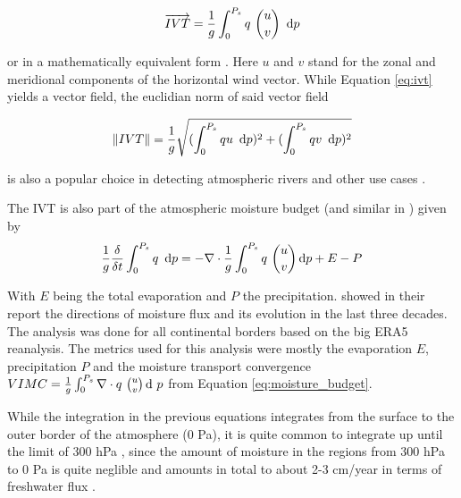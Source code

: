 \begin{equation}
\label{eq:ivt}  
\overrightarrow{IVT} = \frac{1}{g} \int^{P_s}_0 q ~\binom{u}{v} ~ \operatorname{d}\!{p}
\end{equation}

or in a mathematically equivalent form \cite{fernandez_analysis_2003}.
Here $u$ and $v$ stand for the zonal and meridional components of the horizontal wind vector. 
While Equation \ref{eq:ivt} yields a vector field, the euclidian norm of said vector field 

\begin{equation}
\label{eq:ivtnorm}
\lVert IVT \rVert = \frac{1}{g} \sqrt{(\int^{P_s}_0 qu ~ \operatorname{d}\!{p})^2 + (\int^{P_s}_0 qv ~ \operatorname{d}\!{p})^2}  
\end{equation}

is also a popular choice in detecting atmospheric rivers \cite{sousa_north_2020, ramos_atmospheric_2016} and other use cases \cite{ayantobo_integrated_2022}.



The IVT is also part of the atmospheric moisture budget \cite{yang_moisture_2022} (and similar in \cite{seager_mechanisms_2020}) given by 
\begin{equation}
\label{eq:moisture_budget}
\frac{1}{g} \frac{\delta}{\delta t} \int^{P_s}_0 q ~ \operatorname{d}\!{p} = - \nabla \cdot \frac{1}{g} \int^{P_s}_0 q ~\binom{u}{v} \operatorname{d}\!{p} + E - P
\end{equation}

With $E$ being the total evaporation and $P$ the precipitation. 
\citeauthor{yang_moisture_2022} showed in their report \cite{yang_moisture_2022} the directions of moisture flux and its evolution in the last three decades. The analysis was done for all continental borders based on the big ERA5 reanalysis.
The metrics used for this analysis were mostly the evaporation $E$, precipitation $P$ and the moisture transport convergence  $VIMC = \frac{1}{g} \int^{P_s}_0  \nabla \cdot q ~\binom{u}{v} \operatorname{d}\!{~} p$ from Equation \ref{eq:moisture_budget}.

While the integration in the previous equations integrates from the surface to the outer border of the atmosphere (0 Pa), it is quite common to integrate up until the limit of 300 hPa \cite{ayantobo_integrated_2022, zhu_proposed_1998, kim_ensos_2015, guirguis_circulation_2018}, since the amount of moisture in the regions from 300 hPa to 0 Pa is quite neglible and amounts in total to about 2-3 cm/year in terms of freshwater flux \cite{zhou_atmospheric_2005}.

